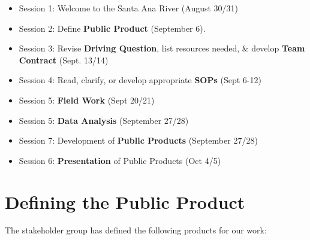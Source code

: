 \documentclass{tufte-handout}\usepackage[]{graphicx}\usepackage[]{color}
\begin{document}
\begin{itemize}
  \item Session 1: Welcome to the Santa Ana River (August 30/31)
  \item Session 2: Define \textbf{Public Product} (September 6).  
  \item Session 3: Revise \textbf{Driving Question}, list resources needed,  \& develop \textbf{Team Contract} (Sept. 13/14)
  \item Session 4: Read, clarify, or develop appropriate \textbf{SOPs} (Sept 6-12)
  \item Session 5: \textbf{Field Work} (Sept 20/21)
  \item Session 5: \textbf{Data Analysis} (September 27/28)
  \item Session 7: Development of \textbf{Public Products} (September 27/28)
  \item Session 6: \textbf{Presentation} of Public Products (Oct 4/5)
\end{itemize}

\section{Defining the Public Product}

The stakeholder group has defined the following products for our work:
\end{document}
